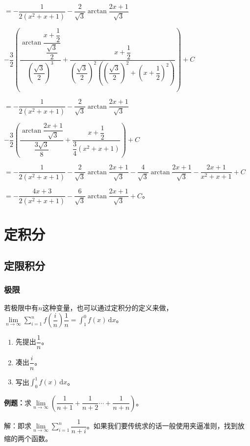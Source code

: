 \documentclass[UTF8, 12pt]{ctexart}
\begin{document}
$=-\dfrac{1}{2(x^2+x+1)}-\dfrac{2}{\sqrt{3}}\arctan\dfrac{2x+1}{\sqrt{3}}$

$-\dfrac{3}{2}\left(\dfrac{\arctan\dfrac{x+\dfrac{1}{2}}{\dfrac{\sqrt{3}}{2}}}{\left(\dfrac{\sqrt{3}}{2}\right)^3}+\dfrac{x+\dfrac{1}{2}}{\left(\dfrac{\sqrt{3}}{2}\right)^2\left(\left(\dfrac{\sqrt{3}}{2}\right)^2+\left(x+\dfrac{1}{2}\right)^2\right)}\right)+C$

$=-\dfrac{1}{2(x^2+x+1)}-\dfrac{2}{\sqrt{3}}\arctan\dfrac{2x+1}{\sqrt{3}}$

$-\dfrac{3}{2}\left(\dfrac{\arctan\dfrac{2x+1}{\sqrt{3}}}{\dfrac{3\sqrt{3}}{8}}+\dfrac{x+\dfrac{1}{2}}{\dfrac{3}{4}\left(x^2+x+1\right)}\right)+C$

$=-\dfrac{1}{2(x^2+x+1)}-\dfrac{2}{\sqrt{3}}\arctan\dfrac{2x+1}{\sqrt{3}}-\dfrac{4}{\sqrt{3}}\arctan\dfrac{2x+1}{\sqrt{3}}-\dfrac{2x+1}{x^2+x+1}+C$

$=-\dfrac{4x+3}{2(x^2+x+1)}-\dfrac{6}{\sqrt{3}}\arctan\dfrac{2x+1}{\sqrt{3}}+C$。

\section{定积分}

\subsection{定限积分}

\subsubsection{极限}

若极限中有$n$这种变量，也可以通过定积分的定义来做，$\lim\limits_{n\to\infty}\sum\limits_{i=1}^nf\left(\dfrac{i}{n}\right)\dfrac{1}{n}=\int_1^0f(x)\,\textrm{d}x$。

\begin{enumerate}
    \item 先提出$\dfrac{1}{n}$。
    \item 凑出$\dfrac{i}{n}$。
    \item 写出$\int_0^1f(x)\,\textrm{d}x$。
\end{enumerate}

\textbf{例题：}求$\lim\limits_{n\to\infty}\left(\dfrac{1}{n+1}+\dfrac{1}{n+2}\cdots+\dfrac{1}{n+n}\right)$。

解：即求$\lim\limits_{n\to\infty}\sum\limits_{i=1}^n\dfrac{1}{n+i}$。如果我们要传统求的话一般使用夹逼准则，找到放缩的两个函数。
\end{document}
